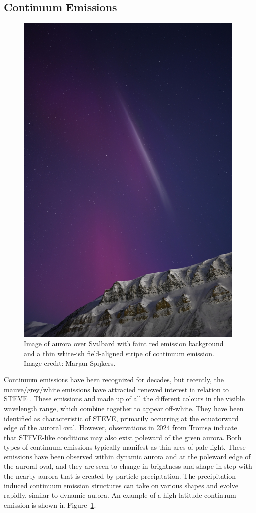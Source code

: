 \documentclass{article}
\renewcommand{\cite}[1]{\parencite{#1}}
\newcommand{\contributed}[1]{%
    \par\noindent
    \begingroup
    \setlength{\leftskip}{1em}%
    \itshape
    Contributors: #1
    \par
    \endgroup
    \vspace{0.5em}
}
\begin{document}
\subsection{Continuum Emissions}\label{continuum} 
\begin{figure}[h!]
\begin{centering}
  \includegraphics[width=0.4\linewidth]{Fig9_Continuum_MarjanSpijkers.jpg}
  \caption{Image of aurora over Svalbard with faint red emission background and a thin white-ish field-aligned stripe of continuum emission. Image credit: Marjan Spijkers.}
  \label{ContinuumExample}
  \end{centering}
\end{figure}

Continuum emissions have been recognized for decades, but recently, the mauve/grey/white emissions have attracted renewed interest in relation to STEVE \cite{Gillies2019}. These emissions and made up of all the different colours in the visible wavelength range, which combine together to appear off-white. They have been identified as characteristic of STEVE, primarily occurring at the equatorward edge of the auroral oval. However, observations in 2024 from Tromsø \cite{Nanjo2024} indicate that STEVE-like conditions may also exist poleward of the green aurora. Both types of continuum emissions typically manifest as thin arcs of pale light. These emissions have been observed within dynamic aurora and at the poleward edge of the auroral oval, and they are seen to change in brightness and shape in step with the nearby aurora that is created by particle precipitation. The precipitation-induced continuum emission structures can take on various shapes and evolve rapidly, similar to dynamic aurora. An example of a high-latitude continuum emission is shown in Figure~\ref{ContinuumExample}.
\end{document}
